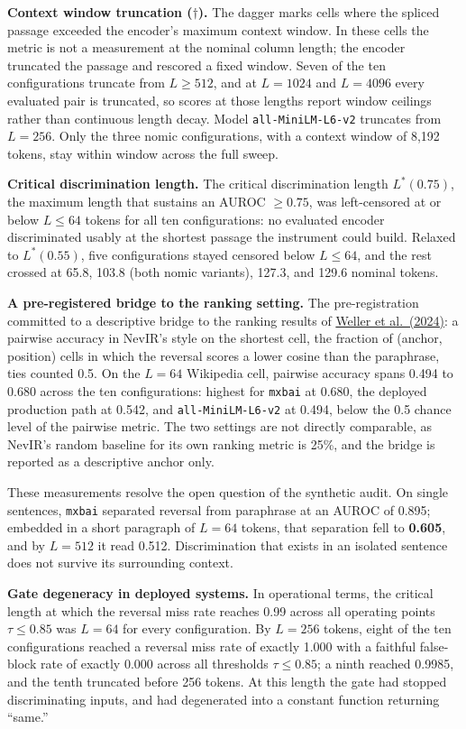 \documentclass[11pt]{article}
\begin{document}
\textbf{Context window truncation ($\dagger$).} The dagger marks cells where the spliced passage exceeded the encoder's maximum context window. In these cells the metric is not a measurement at the nominal column length; the encoder truncated the passage and rescored a fixed window. Seven of the ten configurations truncate from $L \ge 512$, and at $L = 1024$ and $L = 4096$ every evaluated pair is truncated, so scores at those lengths report window ceilings rather than continuous length decay. Model \texttt{all-MiniLM-L6-v2} truncates from $L = 256$. Only the three nomic configurations, with a context window of 8,192 tokens, stay within window across the full sweep.

\textbf{Critical discrimination length.} The critical discrimination length $L^*(0.75)$, the maximum length that sustains an AUROC $\ge 0.75$, was left-censored at or below $L \le 64$ tokens for all ten configurations: no evaluated encoder discriminated usably at the shortest passage the instrument could build. Relaxed to $L^*(0.55)$, five configurations stayed censored below $L \le 64$, and the rest crossed at 65.8, 103.8 (both nomic variants), 127.3, and 129.6 nominal tokens.

\textbf{A pre-registered bridge to the ranking setting.} The pre-registration committed to a descriptive bridge to the ranking results of \hyperlink{bib:weller}{Weller et al.\ (2024)}: a pairwise accuracy in NevIR's style on the shortest cell, the fraction of (anchor, position) cells in which the reversal scores a lower cosine than the paraphrase, ties counted 0.5. On the $L = 64$ Wikipedia cell, pairwise accuracy spans 0.494 to 0.680 across the ten configurations: highest for \texttt{mxbai} at 0.680, the deployed production path at 0.542, and \texttt{all-MiniLM-L6-v2} at 0.494, below the 0.5 chance level of the pairwise metric. The two settings are not directly comparable, as NevIR's random baseline for its own ranking metric is 25\%, and the bridge is reported as a descriptive anchor only.

These measurements resolve the open question of the synthetic audit. On single sentences, \texttt{mxbai} separated reversal from paraphrase at an AUROC of 0.895; embedded in a short paragraph of $L = 64$ tokens, that separation fell to \textbf{0.605}, and by $L = 512$ it read 0.512. Discrimination that exists in an isolated sentence does not survive its surrounding context.

\textbf{Gate degeneracy in deployed systems.} In operational terms, the critical length at which the reversal miss rate reaches 0.99 across all operating points $\tau \le 0.85$ was $L = 64$ for every configuration. By $L = 256$ tokens, eight of the ten configurations reached a reversal miss rate of exactly 1.000 with a faithful false-block rate of exactly 0.000 across all thresholds $\tau \le 0.85$; a ninth reached 0.9985, and the tenth truncated before 256 tokens. At this length the gate had stopped discriminating inputs, and had degenerated into a constant function returning ``same.''
\end{document}
